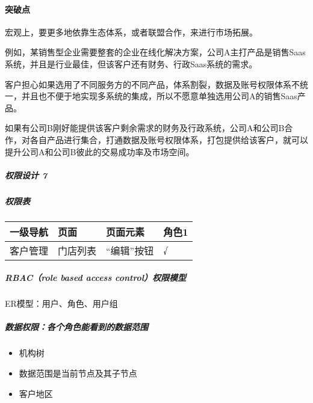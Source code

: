 \documentclass[letterpaper,11pt,english]{sphinxmanual}
\begin{document}
\paragraph{突破点}
\label{\detokenize{chapter_introduction/2B:id14}}
宏观上，要更多地依靠生态体系，或者联盟合作，来进行市场拓展。

例如，某销售型企业需要整套的企业在线化解决方案，公司A主打产品是销售Saas系统，并且是行业最佳，但该客户还有财务、行政Saas系统的需求。

客户担心如果选用了不同服务方的不同产品，体系割裂，数据及账号权限体系不统一，并且也不便于地实现多系统的集成，所以不愿意单独选用公司A的销售Saas产品。

如果有公司B刚好能提供该客户剩余需求的财务及行政系统，公司A和公司B合作，对各自产品进行集合，打通数据及账号权限体系，打包提供给该客户，就可以提升公司A和公司B彼此的交易成功率及市场空间。


\subparagraph{权限设计 7\sphinxfootnotemark[52]}
\label{\detokenize{chapter_introduction/2B:id15}}%
\begin{footnotetext}[52]\sphinxAtStartFootnote
{}
%
\end{footnotetext}\ignorespaces 

\subparagraph{权限表}
\label{\detokenize{chapter_introduction/2B:id16}}

\begin{savenotes}\sphinxattablestart
\centering
\begin{tabulary}{\linewidth}[t]{|T|T|T|T|}
\hline
\sphinxstyletheadfamily 
一级导航
&\sphinxstyletheadfamily 
页面
&\sphinxstyletheadfamily 
页面元素
&\sphinxstyletheadfamily 
角色1
\\
\hline
客户管理
&
门店列表
&
“编辑”按钮
&
√
\\
\hline
\end{tabulary}
\par
\sphinxattableend\end{savenotes}


\subparagraph{RBAC（role based access control）权限模型}
\label{\detokenize{chapter_introduction/2B:rbac-role-based-access-control}}
ER模型：用户、角色、用户组


\subparagraph{数据权限：各个角色能看到的数据范围}
\label{\detokenize{chapter_introduction/2B:id17}}\begin{itemize}
\item {} 
机构树

\item {} 
数据范围是当前节点及其子节点

\item {} 
客户地区

\end{itemize}
\end{document}
